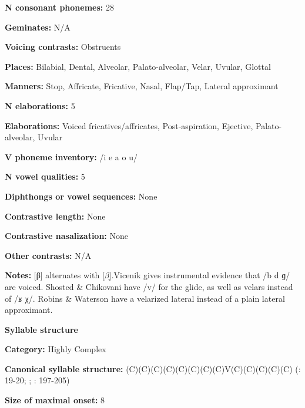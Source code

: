 \textbf{N consonant phonemes:} 28



\textbf{Geminates:} N/A



\textbf{Voicing contrasts:} Obstruents



\textbf{Places:} Bilabial, Dental, Alveolar, Palato-alveolar, Velar, Uvular, Glottal



\textbf{Manners:} Stop, Affricate, Fricative, Nasal, Flap/Tap, Lateral approximant



\textbf{N elaborations:} 5



\textbf{Elaborations:} Voiced fricatives/affricates, Post-aspiration, Ejective, Palato-alveolar, Uvular



\textbf{V phoneme inventory:} /i e a o u/



\textbf{N vowel qualities:} 5



\textbf{Diphthongs or vowel sequences:} None



\textbf{Contrastive length:} None



\textbf{Contrastive nasalization:} None



\textbf{Other contrasts:} N/A



\textbf{Notes:} [β] alternates with [$\beta ̞$].Vicenik gives instrumental evidence that /b d ɡ/ are voiced. Shosted \& Chikovani have /v/ for the glide, as well as velars instead of /ʁ χ/. Robins \& Waterson have a velarized lateral instead of a plain lateral approximant.



\textbf{Syllable structure}



\textbf{Category:} Highly Complex



\textbf{Canonical syllable structure:} (C)(C)(C)(C)(C)(C)(C)(C)V(C)(C)(C)(C)(C) (\citealt{Hewitt1995}: 19-20; \citealt{Vogt1958}; \citealt{Butskhrikidze2002}: 197-205)



\textbf{Size of maximal onset:} 8



